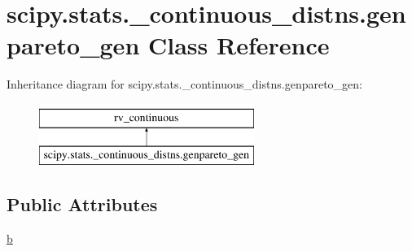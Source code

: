 \hypertarget{classscipy_1_1stats_1_1__continuous__distns_1_1genpareto__gen}{}\section{scipy.\+stats.\+\_\+continuous\+\_\+distns.\+genpareto\+\_\+gen Class Reference}
\label{classscipy_1_1stats_1_1__continuous__distns_1_1genpareto__gen}
Inheritance diagram for scipy.\+stats.\+\_\+continuous\+\_\+distns.\+genpareto\+\_\+gen\+:\begin{figure}[H]
\begin{center}
\leavevmode
\includegraphics[height=2.000000cm]{classscipy_1_1stats_1_1__continuous__distns_1_1genpareto__gen}
\end{center}
\end{figure}
\subsection*{Public Attributes}
\begin{DoxyCompactItemize}
\item 
\hyperlink{classscipy_1_1stats_1_1__continuous__distns_1_1genpareto__gen_a97ada51c94e2eeaf04ceda8ec6fe5158}{b}
\end{DoxyCompactItemize}


